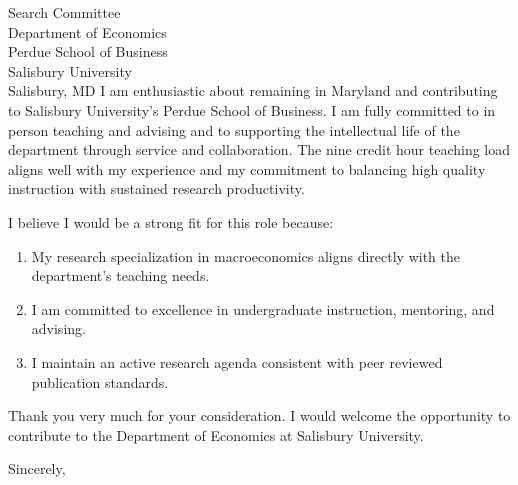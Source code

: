 \documentclass[11pt,letterpaper]{letter}
\begin{document}
\begin{letter}{
Search Committee \\
Department of Economics \\
Perdue School of Business \\
Salisbury University \\
Salisbury, MD
}
I am enthusiastic about remaining in Maryland and contributing to Salisbury University’s Perdue School of Business. I am fully committed to in person teaching and advising and to supporting the intellectual life of the department through service and collaboration. The nine credit hour teaching load aligns well with my experience and my commitment to balancing high quality instruction with sustained research productivity.

I believe I would be a strong fit for this role because:
\begin{enumerate}
    \item My research specialization in macroeconomics aligns directly with the department’s teaching needs.
    \item I am committed to excellence in undergraduate instruction, mentoring, and advising.
    \item I maintain an active research agenda consistent with peer reviewed publication standards.
\end{enumerate}

Thank you very much for your consideration. I would welcome the opportunity to contribute to the Department of Economics at Salisbury University.

\closing{Sincerely,}

\end{letter}
\end{document}

